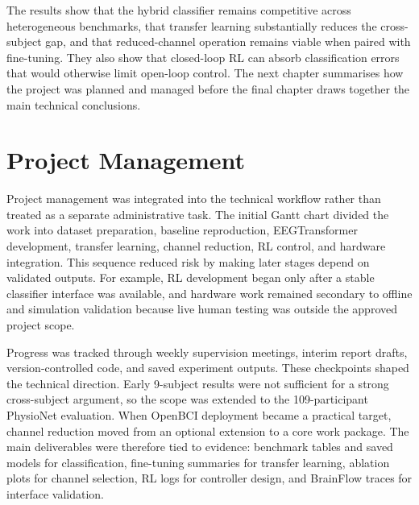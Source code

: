 \documentclass[12pt, a4paper]{article}
\begin{document}
The results show that the hybrid classifier remains competitive across heterogeneous benchmarks, that transfer learning substantially reduces the cross-subject gap, and that reduced-channel operation remains viable when paired with fine-tuning. They also show that closed-loop RL can absorb classification errors that would otherwise limit open-loop control. The next chapter summarises how the project was planned and managed before the final chapter draws together the main technical conclusions.

\section{Project Management}

Project management was integrated into the technical workflow rather than treated as a separate administrative task. The initial Gantt chart divided the work into dataset preparation, baseline reproduction, EEGTransformer development, transfer learning, channel reduction, RL control, and hardware integration. This sequence reduced risk by making later stages depend on validated outputs. For example, RL development began only after a stable classifier interface was available, and hardware work remained secondary to offline and simulation validation because live human testing was outside the approved project scope.

Progress was tracked through weekly supervision meetings, interim report drafts, version-controlled code, and saved experiment outputs. These checkpoints shaped the technical direction. Early 9-subject results were not sufficient for a strong cross-subject argument, so the scope was extended to the 109-participant PhysioNet evaluation. When OpenBCI deployment became a practical target, channel reduction moved from an optional extension to a core work package. The main deliverables were therefore tied to evidence: benchmark tables and saved models for classification, fine-tuning summaries for transfer learning, ablation plots for channel selection, RL logs for controller design, and BrainFlow traces for interface validation.
\end{document}
